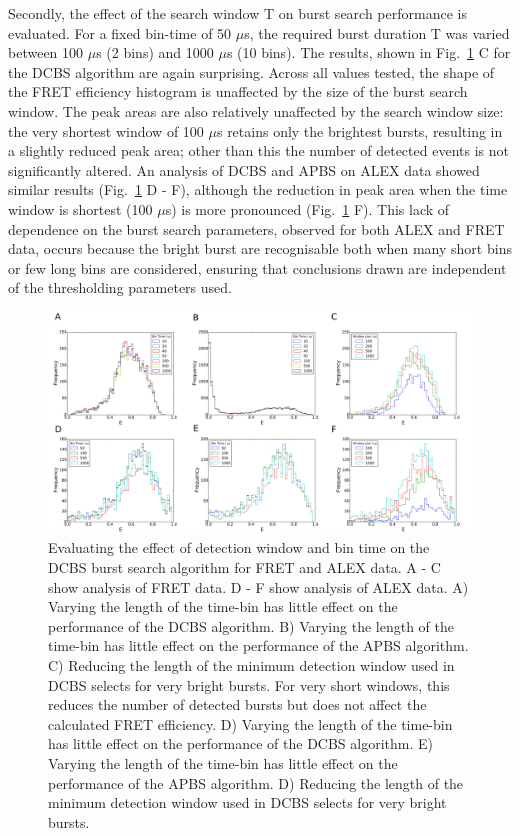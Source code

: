 Secondly, the effect of the search window T on burst search performance is evaluated. For a fixed bin-time of 50 $\mu$s,  the required burst duration T was varied between 100 $\mu$s (2 bins) and 1000 $\mu$s (10 bins). The results, shown in Fig.~\ref{fig:fig7_binning} C for the DCBS algorithm are again surprising. Across all values tested, the shape of the FRET efficiency histogram is unaffected by the size of the burst search window. The peak areas are also relatively unaffected by the search window size: the very shortest window of 100 $\mu$s retains only the brightest bursts, resulting in a slightly reduced peak area; other than this the number of detected events is not significantly altered. An analysis of DCBS and APBS on ALEX data showed similar results (Fig.~\ref{fig:fig7_binning} D - F), although the reduction in peak area when the time window is shortest (100 $\mu$s) is more pronounced (Fig.~\ref{fig:fig7_binning} F). This lack of dependence on the burst search parameters, observed for both ALEX and FRET data, occurs because the bright burst are recognisable both when many short bins or few long bins are considered, ensuring that conclusions drawn are independent of the thresholding parameters used.

\begin{figure}[!ht]
   \begin{center}
      \includegraphics*[clip=true, width=6.5in]{pyFRET/window_effect.pdf}
      \caption{Evaluating the effect of detection window and bin time on the DCBS burst search algorithm for FRET and ALEX data. A - C show analysis of FRET data. D - F show analysis of ALEX data. A) Varying the length of the time-bin has little effect on the performance of the DCBS algorithm. B) Varying the length of the time-bin has little effect on the performance of the APBS algorithm. C) Reducing the length of the minimum detection window used in DCBS selects for very bright bursts. For very short windows, this reduces the number of detected bursts but does not affect the calculated FRET efficiency. D) Varying the length of the time-bin has little effect on the performance of the DCBS algorithm. E) Varying the length of the time-bin has little effect on the performance of the APBS algorithm. D) Reducing the length of the minimum detection window used in DCBS selects for very bright bursts.}
      \label{fig:fig7_binning}
   \end{center}
\end{figure}


